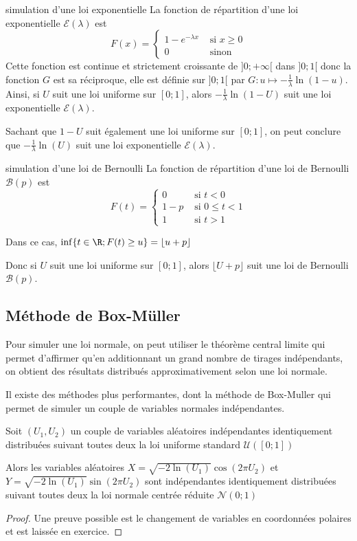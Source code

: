 \begin{exemple}{simulation d'une loi exponentielle}{}
	La fonction de répartition d'une loi exponentielle $\mathcal{E}(\lambda)$ est 
	$$F(x) = \begin{cases}1-e^{-\lambda x} & \text{ si } x \geq 0 \\
	0 & \text{ sinon }
	\end{cases}$$
	Cette fonction est continue et strictement croissante de $]0;+\infty[$ dans $]0;1[$ donc la fonction $G$ est sa réciproque, elle est définie sur $]0;1[$ par $G \colon u \mapsto -\frac{1}{\lambda}\ln(1-u)$. Ainsi, si $U$ suit une loi uniforme sur $[0;1]$, alors $-\frac{1}{\lambda}\ln(1-U)$ suit une loi exponentielle $\mathcal{E}(\lambda)$. 
	
	Sachant que $1-U$ suit également une  loi uniforme sur $[0;1]$, on peut conclure que $-\frac{1}{\lambda}\ln(U)$ suit une loi exponentielle $\mathcal{E}(\lambda)$. 
\end{exemple}

\begin{exemple}{simulation d'une loi de Bernoulli}{}
	La fonction de répartition d'une loi de Bernoulli $\mathcal{B}(p)$ est 
	$$F(t) = \begin{cases}
	0  & \text{ si } t<0  \\
	1-p & \text{ si } 0 \leq t < 1 \\
	1 & \text{ si } t>1
	\end{cases}$$
	
	Dans ce cas, $\inf\{t\in \R ;  F(t)\geq u \} = \lfloor u+p \rfloor$
	
	Donc si $U$ suit une loi uniforme sur $[0;1]$, alors $\lfloor U+p \rfloor$ suit une loi de Bernoulli  $\mathcal{B}(p)$. 
\end{exemple}

\subsection{Méthode de Box-Müller}
Pour simuler une loi normale, on peut utiliser le théorème central limite  qui permet d'affirmer qu'en additionnant un grand nombre de tirages indépendants, on obtient des résultats distribués approximativement selon une loi normale. 

Il existe des méthodes plus performantes, dont la méthode de Box-Muller qui permet de simuler un couple de variables normales indépendantes. 

\begin{proposition}{}{}
	Soit \((U_1 , U_2)\) un couple de variables aléatoires indépendantes
	identiquement distribuées suivant toutes deux la loi uniforme standard
	\(\mathcal U ([0;1])\)
	
	Alors les variables aléatoires
	\(X = \sqrt{-2 \ln (U_1)} \cos (2 \pi U_2)\) et
	\(Y = \sqrt{-2 \ln (U_1)} \sin (2 \pi U_2)\) sont indépendantes
	identiquement distribuées suivant toutes deux la loi normale centrée
	réduite \(\mathcal N (0;1)\)
\end{proposition}
\begin{proof}
	Une preuve possible est le changement de variables en coordonnées polaires et est laissée en exercice.
\end{proof}




